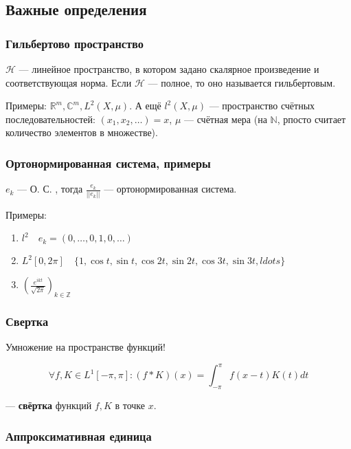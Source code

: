 \documentclass{article}
\begin{document}
\subsection{Важные определения}

\subsubsection{Гильбертово пространство}

$\mathcal{H}$ --- линейное пространство, в котором задано скалярное произведение и соответствующая норма. Если $\mathcal{H}$ --- полное, то оно называется гильбертовым.

Примеры: $\mathbb{R}^m, \mathbb{C}^m, L^2(X, \mu)$. А ещё $l^2(X, \mu)$ --- пространство счётных последовательностей: $(x_1, x_2, \ldots) = x$, $\mu$ --- счётная мера (на $\mathbb{N}$, рпосто считает количество элементов в множестве).

\subsubsection{Ортонормированная система, примеры}

${e_k}$ --- О. С. , тогда ${\frac{e_k}{|| e_k ||}}$ --- ортонормированная система.

Примеры: 

\begin{enumerate}
    \item $l^2 \quad e_k = (0, \ldots, 0, 1, 0, \ldots)$
    \item $L^2[0, 2\pi] \quad \{1, \cos t, \sin t, \cos 2t, \sin 2t, \cos 3t, \sin 3t, ldots\}$
    \item $\left(\frac{e^{ikt}}{\sqrt{2\pi}}\right)_{k \in \mathbb{Z}}$
\end{enumerate}

\subsubsection{Свертка}

Умножение на пространстве функций!

\[\forall f, K \in L^1[-\pi, \pi]: (f * K)(x) = \int_{-\pi}^{\pi} f(x - t)K(t) dt\]

--- \textbf{свёртка} функций $f, K$ в точке $x$.

\subsubsection{Аппроксимативная единица}
\end{document}
